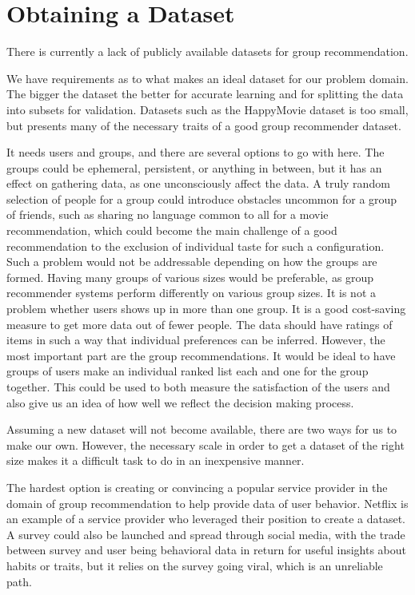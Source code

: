\section{Obtaining a Dataset}\label{sec:futurework_obtainingadataset}
There is currently a lack of publicly available datasets for group recommendation.

We have requirements as to what makes an ideal dataset for our problem domain. The bigger the dataset the better for accurate learning and for splitting the data into subsets for validation. Datasets such as the HappyMovie dataset is too small, but presents many of the necessary traits of a good group recommender dataset\cite{HappyMovie}.

It needs users and groups, and there are several options to go with here. The groups could be ephemeral, persistent, or anything in between, but it has an effect on gathering data, as one unconsciously affect the data. A truly random selection of people for a group could introduce obstacles uncommon for a group of friends, such as sharing no language common to all for a movie recommendation, which could become the main challenge of a good recommendation to the exclusion of individual taste for such a configuration. Such a problem would not be addressable depending on how the groups are formed. Having many groups of various sizes would be preferable, as group recommender systems perform differently on various group sizes. It is not a problem whether users shows up in more than one group. It is a good cost-saving measure to get more data out of fewer people. The data should have ratings of items in such a way that individual preferences can be inferred. However, the most important part are the group recommendations. It would be ideal to have groups of users make an individual ranked list each  and one for the group together. This could be used to both measure the satisfaction of the users and also give us an idea of how well we reflect the decision making process.

Assuming a new dataset will not become available, there are two ways for us to make our own. However, the necessary scale in order to get a dataset of the right size makes it a difficult task to do in an inexpensive manner.

The hardest option is creating or convincing a popular service provider in the domain of group recommendation to help provide data of user behavior. Netflix is an example of a service provider who leveraged their position to create a dataset. A survey could also be launched and spread through social media, with the trade between survey and user being behavioral data in return for useful insights about habits or traits, but it relies on the survey going viral, which is an unreliable path.

